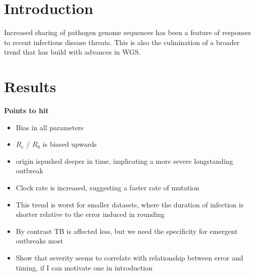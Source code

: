 \documentclass{article}
\begin{document}
\begin{spacing}{1.5}
\section*{Introduction}
Increased sharing of pathogen genome sequences has been a feature of responses to recent infectious disease threats. This is also the culmination of a broader trend that has build with advances in WGS. 

\section*{Results}
\textbf{Points to hit}
\begin{itemize}
    \item Bias in all parameters
    \item $R_e$ / $R_0$ is biased upwards
    \item origin ispushed deeper in time, implicating a more severe longstanding outbreak
    \item Clock rate is increased, suggesting a faster rate of mutation
    \item This trend is worst for smaller datasets, where the duration of infection is shorter relative to the error induced in rounding
    \item By contrast TB is affected less, but we need the specificity for emergent outbreaks most
    \item Show that severity seems to correlate with relationship between error and timing, if I can motivate one in introduction
\end{itemize}


\end{spacing}
\end{document}
